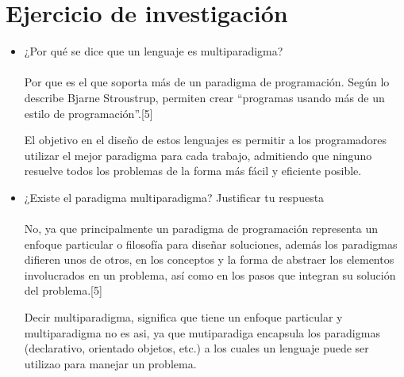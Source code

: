 \documentclass{article}
\begin{document}
\section{Ejercicio de investigaci\'on}
\begin{itemize}
    
    \item ¿Por qu\'e se dice que un lenguaje es multiparadigma?\\
    \\Por que es el que soporta más de un paradigma de programación. Según lo describe Bjarne Stroustrup, permiten crear “programas usando más de un estilo de programación”.[5]

El objetivo en el diseño de estos lenguajes es permitir a los programadores utilizar el mejor paradigma para cada trabajo, admitiendo que ninguno resuelve todos los problemas de la forma más fácil y eficiente posible. 
    \item ¿Existe el paradigma multiparadigma? Justificar tu respuesta\\
       \\ No, ya que principalmente un paradigma  de programación representa un enfoque particular o filosofía para diseñar soluciones, adem\'as los paradigmas difieren unos de otros, en los conceptos y la forma de abstraer los elementos involucrados en un problema, así como en los pasos que integran su solución del problema.[5]
        
        Decir multiparadigma, significa que tiene un enfoque particular y multiparadigma no es asi, ya que mutiparadiga encapsula los paradigmas (declarativo, orientado  objetos, etc.)  a los cuales un lenguaje puede ser utilizao para manejar un problema.
\end{itemize}
\end{document}
